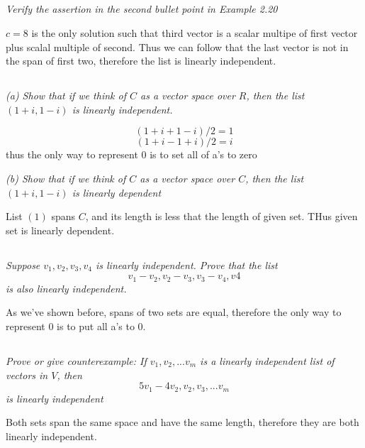 \documentclass[11pt,oneside,titlepage]{book}
\begin{document}
\subsection{}
\textit{Verify the assertion in the second bullet point in Example 2.20}

$c = 8$ is the only solution such that third vector is a
scalar multipe of first vector plus scalal multiple of second. Thus we
can follow that the last vector is not in the span of first two, therefore
the list is linearly independent.

\subsection{}
\textit{(a) Show that if we think of $C$ as a vector space over $R$, then the
  list $(1 + i, 1 - i)$ is linearly independent.}

$$(1 + i  + 1 - i)/2 = 1$$
$$(1 + i - 1 + i)/2 = i$$
thus the only way to represent $0$ is to set all of a's to zero

\textit{(b) Show that if we think of $C$ as a vector space over $C$, then
  the list $(1 + i, 1 - i)$ is linearly dependent}

List $(1)$ spans $C$, and its length is less that
the length of given set. THus given set is linearly dependent.


\subsection{}
\textit{Suppose $v_1, v_2, v_3, v_4$ is linearly independent.
  Prove that the list }
$$v_1 - v_2, v_2 - v_3, v_3 - v_4, v4$$
\textit{is also linearly independent.}

As we've shown before, spans of two sets are equal, therefore the only
way to represent $0$ is to put all a's to 0.



\subsection{}
\textit{Prove or give counterexample: If $v_1, v_2, ... v_m$ is a linearly
  independent list of vectors in $V$, then}
$$5v_1 - 4v_2, v_2, v_3, ... v_m$$
\textit{is linearly independent}

Both sets span the same space and have the same length, therefore they are
both linearly independent.

\subsection{}
\end{document}
